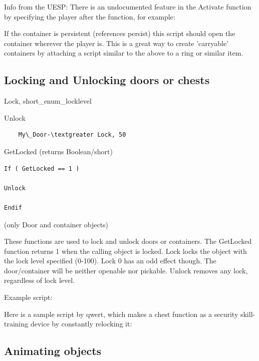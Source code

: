 Info from the UESP: There is an undocumented feature in the Activate
function by specifying the player after the function, for example:



If the container is persistent (references persist) this script should
open the container wherever the player is. This is a great way to create
'carryable' containers by attaching a script similar to the above to a
ring or similar item.

\hypertarget{locking-and-unlocking-doors-or-chests}{%
\subsection{\texorpdfstring{\hfill\break
Locking and Unlocking doors or
chests}{ Locking and Unlocking doors or chests}}\label{locking-and-unlocking-doors-or-chests}}

Lock, short\_enum\_locklevel

Unlock

\begin{lstlisting}
	My\_Door-\textgreater Lock, 50
\end{lstlisting}

GetLocked (returns Boolean/short)

\begin{lstlisting}
If ( GetLocked == 1 )

Unlock

Endif
\end{lstlisting}

(only Door and container objects)

These functions are used to lock and unlock doors or containers. The
GetLocked function returns 1 when the calling object is locked. Lock
locks the object with the lock level specified (0-100). Lock 0 has an
odd effect though. The door/container will be neither openable nor
pickable. Unlock removes any lock, regardless of lock level.

Example script:

Here is a sample script by qwert, which makes a chest function as a
security skill-training device by constantly relocking it:



\hypertarget{animating-objects}{%
\subsection{Animating objects}\label{animating-objects}}

